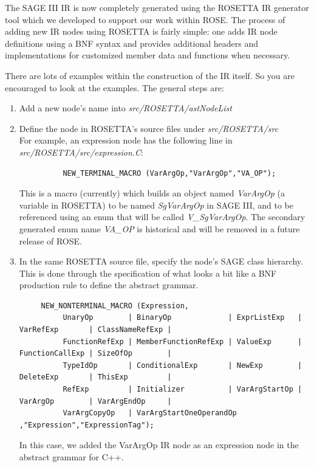 The SAGE III IR is now completely generated using the ROSETTA IR generator tool which 
we developed to support our work within ROSE.
The process of adding new IR nodes using ROSETTA is fairly simple: one
adds IR node definitions using a BNF syntax and provides additional
headers and implementations for customized member data and functions
when necessary. 

  There are lots of examples within the construction of the IR itself.  So you are
encouraged to look at the examples. 
The general steps are:

\begin{enumerate}
     \item Add a new node's name into \textit{src/ROSETTA/astNodeList}
     \item Define the node in ROSETTA's source files under
     \textit{src/ROSETTA/src} \\
           For example, an expression node has the following line in
           \textit{src/ROSETTA/src/expression.C}:
{\indent
{\mySmallFontSize
\begin{verbatim}
          NEW_TERMINAL_MACRO (VarArgOp,"VarArgOp","VA_OP");
\end{verbatim}
}}
           This is a macro (currently) which builds an object named {\em VarArgOp} (a variable in
           ROSETTA) to be named {\em SgVarArgOp} in SAGE III, and to be referenced using an enum
           that will be called {\em V\_SgVarArgOp}.  The secondary generated enum name {\em VA\_OP}
           is historical and will be removed in a future release of ROSE.

     \item In the same ROSETTA source file, specify the node's SAGE class hierarchy. \\
           This is done through the specification of what looks a bit like a BNF
            production rule to define the abstract grammar. \\
{\indent
{\mySmallFontSize
\begin{verbatim}
     NEW_NONTERMINAL_MACRO (Expression,
          UnaryOp        | BinaryOp             | ExprListExp   | VarRefExp       | ClassNameRefExp |
          FunctionRefExp | MemberFunctionRefExp | ValueExp      | FunctionCallExp | SizeOfOp        |
          TypeIdOp       | ConditionalExp       | NewExp        | DeleteExp       | ThisExp         |
          RefExp         | Initializer          | VarArgStartOp | VarArgOp        | VarArgEndOp     |
          VarArgCopyOp   | VarArgStartOneOperandOp ,"Expression","ExpressionTag");
\end{verbatim} 
}}
        In this case, we added the VarArgOp IR node as an expression node in the
    abstract grammar for C++.


\end{enumerate}
